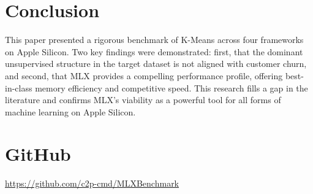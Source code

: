 \documentclass[twocolumn,a4paper]{article}
\begin{document}
\section{Conclusion}
This paper presented a rigorous benchmark of K-Means across four frameworks on Apple Silicon. Two key findings were demonstrated: first, that the dominant unsupervised structure in the target dataset is not aligned with customer churn, and second, that MLX provides a compelling performance profile, offering best-in-class memory efficiency and competitive speed. This research fills a gap in the literature and confirms MLX's viability as a powerful tool for all forms of machine learning on Apple Silicon.





\appendix
\section{GitHub}
\href{https://github.com/c2p-cmd/MLXBenchmark}{https://github.com/c2p-cmd/MLXBenchmark}
\end{document}
